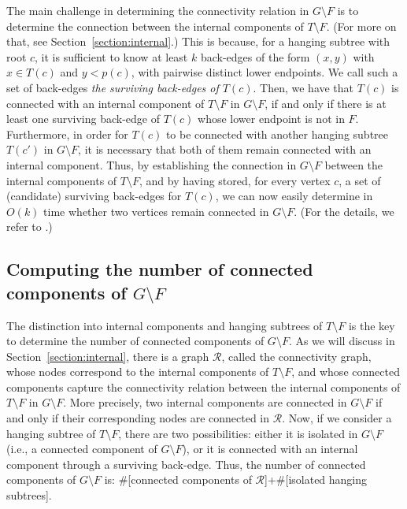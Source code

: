 \documentclass[11pt,a4paper]{article}
\begin{document}
The main challenge in determining the connectivity relation in $G\setminus F$ is to determine the connection between the internal components of $T\setminus F$. (For more on that, see Section~\ref{section:internal}.) This is because, for a hanging subtree with root $c$, it is sufficient to know at least $k$ back-edges of the form $(x,y)$ with $x\in T(c)$ and $y<p(c)$, with pairwise distinct lower endpoints. We call such a set of back-edges \emph{the surviving back-edges of $T(c)$}. Then, we have that $T(c)$ is connected with an internal component of $T\setminus F$ in $G\setminus F$, if and only if there is at least one surviving back-edge of $T(c)$ whose lower endpoint is not in $F$. Furthermore, in order for $T(c)$ to be connected with another hanging subtree $T(c')$ in $G\setminus F$, it is necessary that both of them remain connected with an internal component. Thus, by establishing the connection in $G\setminus F$ between the internal components of $T\setminus F$, and by having stored, for every vertex $c$, a set of (candidate) surviving back-edges for $T(c)$, we can now easily determine in $O(k)$ time whether two vertices remain connected in $G\setminus F$. (For the details, we refer to \cite{DBLP:conf/esa/Kosinas23}.)

\subsection{Computing the number of connected components of $G\setminus F$}
\label{section:numberOfComponents}
The distinction into internal components and hanging subtrees of $T\setminus F$ is the key to determine the number of connected components of $G\setminus F$. As we will discuss in Section~\ref{section:internal}, there is a graph $\mathcal{R}$, called the connectivity graph, whose nodes correspond to the internal components of $T\setminus F$, and whose connected components capture the connectivity relation between the internal components of $T\setminus F$ in $G\setminus F$. More precisely, two internal components are connected in $G\setminus F$ if and only if their corresponding nodes are connected in $\mathcal{R}$. Now, if we consider a hanging subtree of $T\setminus F$, there are two possibilities: either it is isolated in $G\setminus F$ (i.e., a connected component of $G\setminus F$), or it is connected with an internal component through a surviving back-edge. Thus, the number of connected components of $G\setminus F$ is: $\#$[connected components of $\mathcal{R}$]+$\#$[isolated hanging subtrees].
\end{document}
